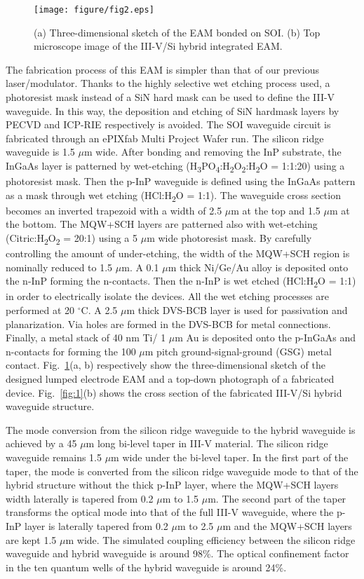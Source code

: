 \documentclass[aip,apl,preprint,a4paper]{revtex4-1}
\def\SB#1{\textsubscript{#1}}
\begin{document}
\begin{figure}
	\texttt{[image: figure/fig2.eps]}%
	\caption{\label{fig:2} (a) Three-dimensional sketch of the EAM bonded on SOI. (b) Top microscope image of the III-V/Si hybrid integrated EAM.}
\end{figure}


The fabrication process of this EAM is simpler than that of our previous laser/modulator.\cite{Transceiver,roelkensiii-v-on-silicon2015,fu52015} Thanks to the highly selective wet etching process used, a photoresist mask instead of a SiN hard mask can be used to define the III-V waveguide. In this way, the deposition and etching of SiN hardmask layers by PECVD and ICP-RIE respectively is avoided. The SOI waveguide circuit is fabricated through an ePIXfab Multi Project Wafer run.\cite{epixfab} The silicon ridge waveguide is 1.5 $\mu$m wide. After bonding and removing the InP substrate, the InGaAs layer is patterned by wet-etching (H\SB{3}PO\SB{4}:H\SB{2}O\SB{2}:H\SB{2}O = 1:1:20) using a photoresist mask. Then the p-InP waveguide is defined using the InGaAs pattern as a mask through wet etching (HCl:H\SB{2}O = 1:1). The waveguide cross section becomes an inverted trapezoid with a width of 2.5 $\mu$m at the top and 1.5 $\mu$m at the bottom. The MQW+SCH layers are patterned also with wet-etching (Citric:H\SB{2}O\SB{2} = 20:1) using a 5 $\mu$m wide photoresist mask.  By carefully controlling the amount of under-etching, the width of the MQW+SCH region is nominally reduced to 1.5 $\mu$m. A 0.1 $\mu$m thick Ni/Ge/Au alloy is deposited onto the n-InP forming the n-contacts. Then the n-InP is wet etched (HCl:H\SB{2}O = 1:1) in order to electrically isolate the devices. All the wet etching processes are performed at 20 $^{\circ}$C. A 2.5 $\mu$m thick DVS-BCB layer is used for passivation and planarization. Via holes are formed in the DVS-BCB for metal connections. Finally, a metal stack of 40 nm Ti/ 1 $\mu$m Au is deposited onto the p-InGaAs and n-contacts for forming the 100 $\mu$m pitch ground-signal-ground (GSG) metal contact. Fig.~\ref{fig:2}(a, b) respectively show the three-dimensional sketch of the designed lumped electrode EAM and a top-down photograph of a fabricated device. Fig.~\ref{fig:1}(b) shows the cross section of the fabricated III-V/Si hybrid waveguide structure.


The mode conversion from the silicon ridge waveguide to the hybrid waveguide is achieved by a 45 $\mu$m long bi-level taper in III-V material.\cite{fu52015,huang2015ultracompact} The silicon ridge waveguide remains 1.5 $\mu$m wide under the bi-level taper. In the first part of the taper, the mode is converted from the silicon ridge waveguide mode to that of the hybrid structure without the thick p-InP layer, where the MQW+SCH layers width laterally is tapered from 0.2 $\mu$m to 1.5 $\mu$m. The second part of the taper transforms the optical mode into that of the full III-V waveguide, where the p-InP layer is laterally tapered from 0.2 $\mu$m to 2.5 $\mu$m and the MQW+SCH layers are kept 1.5 $\mu$m wide. The simulated coupling efficiency between the silicon ridge waveguide and hybrid waveguide is around 98\%. The optical confinement factor in the ten quantum wells of the hybrid waveguide is around 24\%.
\end{document}
